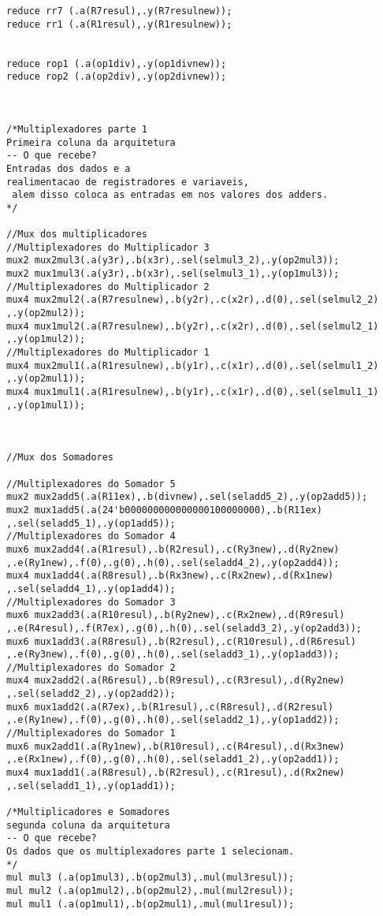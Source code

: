 \begin{lstlisting}[style={verilog-style}]
reduce rr7 (.a(R7resul),.y(R7resulnew));
reduce rr1 (.a(R1resul),.y(R1resulnew));


reduce rop1 (.a(op1div),.y(op1divnew));
reduce rop2 (.a(op2div),.y(op2divnew));



/*Multiplexadores parte 1 
Primeira coluna da arquitetura
-- O que recebe?
Entradas dos dados e a 
realimentacao de registradores e variaveis,
 alem disso coloca as entradas em nos valores dos adders.
*/

//Mux dos multiplicadores 
//Multiplexadores do Multiplicador 3 
mux2 mux2mul3(.a(y3r),.b(x3r),.sel(selmul3_2),.y(op2mul3));
mux2 mux1mul3(.a(y3r),.b(x3r),.sel(selmul3_1),.y(op1mul3));
//Multiplexadores do Multiplicador 2
mux4 mux2mul2(.a(R7resulnew),.b(y2r),.c(x2r),.d(0),.sel(selmul2_2)
,.y(op2mul2));
mux4 mux1mul2(.a(R7resulnew),.b(y2r),.c(x2r),.d(0),.sel(selmul2_1)
,.y(op1mul2));
//Multiplexadores do Multiplicador 1
mux4 mux2mul1(.a(R1resulnew),.b(y1r),.c(x1r),.d(0),.sel(selmul1_2)
,.y(op2mul1));
mux4 mux1mul1(.a(R1resulnew),.b(y1r),.c(x1r),.d(0),.sel(selmul1_1)
,.y(op1mul1));



//Mux dos Somadores 

//Multiplexadores do Somador 5
mux2 mux2add5(.a(R11ex),.b(divnew),.sel(seladd5_2),.y(op2add5));
mux2 mux1add5(.a(24'b000000000000000100000000),.b(R11ex)
,.sel(seladd5_1),.y(op1add5));
//Multiplexadores do Somador 4
mux6 mux2add4(.a(R1resul),.b(R2resul),.c(Ry3new),.d(Ry2new)
,.e(Ry1new),.f(0),.g(0),.h(0),.sel(seladd4_2),.y(op2add4));
mux4 mux1add4(.a(R8resul),.b(Rx3new),.c(Rx2new),.d(Rx1new)
,.sel(seladd4_1),.y(op1add4));
//Multiplexadores do Somador 3
mux6 mux2add3(.a(R10resul),.b(Ry2new),.c(Rx2new),.d(R9resul)
,.e(R4resul),.f(R7ex),.g(0),.h(0),.sel(seladd3_2),.y(op2add3));
mux6 mux1add3(.a(R8resul),.b(R2resul),.c(R10resul),.d(R6resul)
,.e(Ry3new),.f(0),.g(0),.h(0),.sel(seladd3_1),.y(op1add3));
//Multiplexadores do Somador 2
mux4 mux2add2(.a(R6resul),.b(R9resul),.c(R3resul),.d(Ry2new)
,.sel(seladd2_2),.y(op2add2));
mux6 mux1add2(.a(R7ex),.b(R1resul),.c(R8resul),.d(R2resul)
,.e(Ry1new),.f(0),.g(0),.h(0),.sel(seladd2_1),.y(op1add2));
//Multiplexadores do Somador 1
mux6 mux2add1(.a(Ry1new),.b(R10resul),.c(R4resul),.d(Rx3new)
,.e(Rx1new),.f(0),.g(0),.h(0),.sel(seladd1_2),.y(op2add1));
mux4 mux1add1(.a(R8resul),.b(R2resul),.c(R1resul),.d(Rx2new)
,.sel(seladd1_1),.y(op1add1));

/*Multiplicadores e Somadores
segunda coluna da arquitetura
-- O que recebe?
Os dados que os multiplexadores parte 1 selecionam.
*/
mul mul3 (.a(op1mul3),.b(op2mul3),.mul(mul3resul));
mul mul2 (.a(op1mul2),.b(op2mul2),.mul(mul2resul));
mul mul1 (.a(op1mul1),.b(op2mul1),.mul(mul1resul));


\end{lstlisting}
